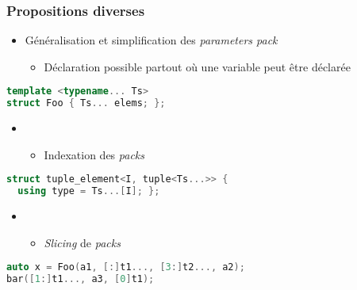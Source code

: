 \documentclass[C++.tex]{subfiles}
\begin{document}
\begin{frame}[fragile]
	\frametitle{Propositions diverses}
	\begin{itemize}
		\item Généralisation et simplification des \textit{parameters pack}
		\begin{itemize}
			\item Déclaration possible partout où une variable peut être déclarée
		\end{itemize}
	\end{itemize}

	\begin{lstlisting}[language=C++]
template <typename... Ts>
struct Foo { Ts... elems; };\end{lstlisting}

	\begin{itemize}
		\item [] \begin{itemize}
			\item Indexation des \textit{packs}
		\end{itemize}
	\end{itemize}

	\begin{lstlisting}[language=C++]
struct tuple_element<I, tuple<Ts...>> {
  using type = Ts...[I]; };\end{lstlisting}

	\begin{itemize}
		\item [] \begin{itemize}
			\item \textit{Slicing} de \textit{packs}
		\end{itemize}
	\end{itemize}

	\begin{lstlisting}[language=C++]
auto x = Foo(a1, [:]t1..., [3:]t2..., a2);
bar([1:]t1..., a3, [0]t1);\end{lstlisting}
\end{frame}
\end{document}
